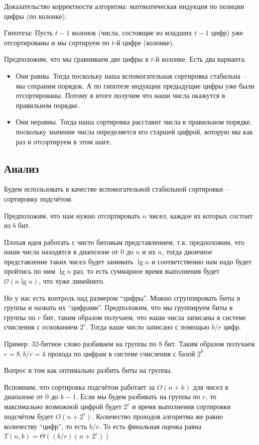 \documentclass[a4paper,11pt]{article}
\begin{document}
Доказательство корректности алгоритма: математическая индукция по позиции цифры
(по колонке).

Гипотеза: Пусть $t-1$ колонок (числа, состоящие из младших $t-1$ цифр) уже
отсортированы и мы сортируем по $t$-й цифре (колонке).

Предположим, что мы сравниваем две цифры в $t$-й колонке. Есть два варианта:

\begin{itemize}
\item Они равны. Тогда поскольку наша вспомогательная сортировка стабильна --
  мы сохраним порядок. А по гипотезе индукции предыдущие цифры уже были
  отсортированы. Потому в итоге получим что наши числа окажутся в правильном
  порядке.
\item Они неравны. Тогда наша сортировка расставит числа в правильном порядке,
  поскольку значение числа определяется его старшей цифрой, которую мы как раз и
  отсортируем в этом шаге.
\end{itemize}

\subsection{Анализ}
Будем использовать в качестве вспомогательной стабильной сортировки --
сортировку подсчётом.

Предположим, что нам нужно отсортировать $n$ чисел, каждое из которых состоит из
$b$ бит.

Плохая идея работать с чисто битовым представлением, т.к. предположим, что наши
числа находятся в диапозоне от $0$ до $n$ и их $n$, тогда двоичное представление
таких чисел будет занимать $\lg n$ и соответственно нам надо будет пройтись по
ним $\lg n$ раз, то есть суммарное время выполнения будет $\mathcal{O}(n \lg
n)$, что хуже линейнего.

Но у нас есть контроль над размером ``цифры''. Можно сгруппировать биты в группы
и назвать их ``цифрами''. Предположим, что мы группируем биты в группы по $r$
бит, таким образом получаем, что наши числа записаны в системе счисления с
основанием $2^r$. Тогда наше число записано с помощью $b/r$ цифр.

Пример: 32-битное слово разбиваем на группы по 8 бит. Таким образом получаем
$r=8, b/r=4$ прохода по цифрам в системе счисления с базой $2^8$

Вопрос в том как оптимально разбить биты на группы.

Вспомним, что сортировка подсчётом работает за $O(n+k)$ для чисел в диапазоне от
0 до $k-1$. Если мы будем разбивать на группы по $r$, то максимально возможной 
цифрой будет $2^r$ и время выполнения сортировки подсчётом будет $O(n + 2^r)$.
Количество проходов алгоритма же равно количеству ``цифр'', то есть $b/r$. То
есть финальная оценка равна $T(n,b) = \Theta((b/r)(n+2^r))$
\end{document}
